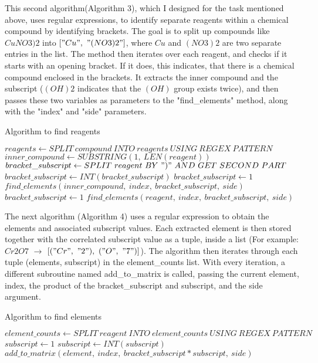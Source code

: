 \documentclass[a4paper,12pt]{article}
\begin{document}
This second algorithm(Algorithm 3), which I designed for the task mentioned above, uses regular expressions, to identify separate reagents within a chemical compound by identifying brackets. The goal is to split up compounds like $ CuNO3)2$ into $ ["Cu",\ "(NO3)2"]$, where $Cu$ and $(NO3)2$ are two separate entries in the list. The method then iterates over each reagent, and checks if it starts with an opening bracket. If it does, this indicates, that there is a chemical compound enclosed in the brackets. It extracts the inner compound and the subscript ($ (OH)2$ indicates that the $(OH)$ group exists twice), and then passes these two variables as parameters to the "find\_elements" method, along with the "index" and "side" parameters.

\begin{algorithm}
\footnotesize
\caption{Algorithm to find reagents}\label{alg:cap}
\begin{algorithmic}
\State $ reagents \gets SPLIT\ compound\ INTO\ reagents\ USING\ REGEX\ PATTERN$
	\State $ inner\_compound \gets SUBSTRING(1,\ LEN(reagent))$
	\State $ bracket\_subscript \gets SPLIT\ reagent\ BY\ ")"\ AND\ GET\ SECOND\ PART$
		\State $ bracket\_subscript \gets INT(bracket\_subscript)$
	\Else
		\State $ bracket\_subscript \gets 1$
	\EndIf
	\State $ find\_elements(inner\_compound,\ index,\ bracket\_subscript,\ side)$
\Else
	\State $ bracket\_subscript \gets 1$
	\State $ find\_elements(reagent,\ index,\ bracket\_subscript,\ side)$
\EndIf
\EndFor
\EndFunction
\end{algorithmic}
\end{algorithm}

The next algorithm (Algorithm 4) uses a regular expression to obtain the elements and associated subscript values. Each extracted element is then stored together with the correlated subscript value as a tuple, inside a list (For example: $Cr2O7$ $\rightarrow$ $[("Cr",\ "2"),\ ("O",\ "7")]$). The algorithm then iterates through each tuple (elements, subscript) in the element\_counts list.
With every iteration, a different subroutine named add\_to\_matrix is called, passing the current element, index, the product of the bracket\_subscript and subscript, and the side argument.

\newpage

\begin{algorithm}
\footnotesize
\caption{Algorithm to find elements}\label{alg:cap}
\begin{algorithmic}
\State $ element\_counts \gets SPLIT\ reagent\ INTO\ element\_counts\ USING\ REGEX\ PATTERN$
	\State $ subscript \gets 1$
\Else
	\State $ subscript \gets INT(subscript)$
\EndIf
\State $ add\_to\_matrix(element,\ index,\ bracket\_subscript * subscript,\ side)$
\EndFor
\EndFunction
\end{algorithmic}
\end{algorithm}
\end{document}
